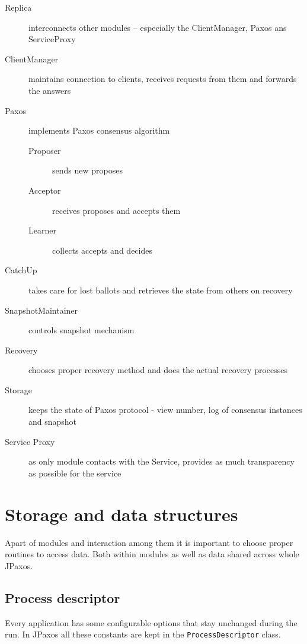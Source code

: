 \begin{description}
  \item[Replica ] interconnects other modules -- especially the ClientManager, Paxos ans ServiceProxy
  \item[ClientManager ] maintains connection to clients, receives requests from them and forwards the answers
  \item[Paxos ] implements Paxos consensus algorithm
  \begin{description}
    \item[Proposer ] sends new proposes
    \item[Acceptor ] receives proposes and accepts them
    \item[Learner ] collects accepts and decides
  \end{description}
  \item[CatchUp ] takes care for lost ballots and retrieves the state from others on recovery
  \item[SnapshotMaintainer ] controls snapshot mechanism
  \item[Recovery ] chooses proper recovery method and does the actual recovery processes
  \item[Storage ] keeps the state of Paxos protocol - view number, log of consensus instances and snapshot
  \item[Service Proxy ] as only module contacts with the Service, provides as much trans\-pa\-rency as possible for the service
\end{description}

\section{Storage and data structures}
\label{sec:storage_and_data_structures}

Apart of modules and interaction among them it is important to choose proper routines to access data. Both within modules as well as data shared across whole JPaxos.

\subsection{Process descriptor}

Every application has some configurable options that stay unchanged during the run. In JPaxos all these constants are kept in the \texttt{ProcessDescriptor} class.

